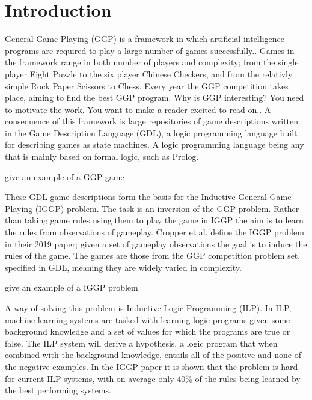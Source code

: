 
\chapter{Introduction}
General Game Playing (GGP) is a framework in which artificial intelligence programs are required to play a large number of games successfully.\cite{Genesereth/GGPOverview}.
Games in the framework range in both number of players and complexity; from the single player Eight Puzzle to the six player Chinese Checkers, and from the relativly simple Rock Paper Scissors to Chess\cite{GGP-Website}. Every year the GGP competition takes place, aiming to find the best GGP program.
\ac{Why is GGP interesting? You need to motivate the work. You want to make a reader excited to read on.}.
A consequence of this framework is large repositories of game descriptions written in the Game Description Language (GDL), a logic programming language built for describing games as state machines\cite{GDL_Spec}. A logic programming language being any that is mainly based on formal logic, such as Prolog.

\ac{give an example of a GGP game}


These GDL game descriptions form the basis for the Inductive General Game Playing (IGGP) problem. The task is an inversion of the GGP problem. Rather than taking game rules using them to play the game in IGGP the aim is to learn the rules from observations of gameplay. Cropper et al. define the IGGP problem in their 2019 paper; given a set of gameplay observations the goal is to induce the rules of the game\cite{Cropper/IGGP}. The games are those from the GGP competition problem set, specified in GDL, meaning they are widely varied in complexity.

\ac{give an example of a IGGP problem}


A way of solving this problem is Inductive Logic Programming (ILP).
In ILP, machine learning systems are tasked with learning logic programs given some background knowledge and a set of values for which the programs are true or false. The ILP system will derive a hypothesis, a logic program that when combined with the background knowledge, entails all of the positive and none of the negative examples\cite{Muggleton/ILP}. In the IGGP paper it is shown that the problem is hard for current ILP systems, with on average only 40\% of the rules being learned by the best performing systems.

